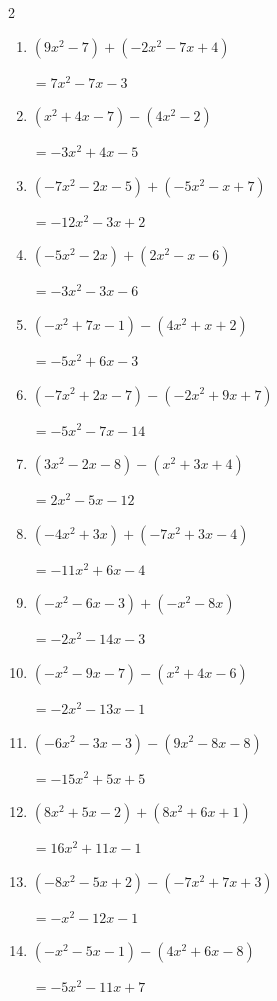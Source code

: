 \begin{multicols}{2}
\begin{enumerate}
  \item $(9x^{2}-7)+(-2x^{2}-7x+4)$

        $=7x^{2}-7x-3$

  \item $(x^{2}+4x-7)-(4x^{2}-2)$

        $=-3x^{2}+4x-5$

  \item $(-7x^{2}-2x-5)+(-5x^{2}-x+7)$

        $=-12x^{2}-3x+2$

  \item $(-5x^{2}-2x)+(2x^{2}-x-6)$

        $=-3x^{2}-3x-6$

  \item $(-x^{2}+7x-1)-(4x^{2}+x+2)$

        $=-5x^{2}+6x-3$

  \item $(-7x^{2}+2x-7)-(-2x^{2}+9x+7)$

        $=-5x^{2}-7x-14$

  \item $(3x^{2}-2x-8)-(x^{2}+3x+4)$

        $=2x^{2}-5x-12$

  \item $(-4x^{2}+3x)+(-7x^{2}+3x-4)$

        $=-11x^{2}+6x-4$

  \item $(-x^{2}-6x-3)+(-x^{2}-8x)$

        $=-2x^{2}-14x-3$

\columnbreak %

  \item $(-x^{2}-9x-7)-(x^{2}+4x-6)$

        $=-2x^{2}-13x-1$

  \item $(-6x^{2}-3x-3)-(9x^{2}-8x-8)$

        $=-15x^{2}+5x+5$

  \item $(8x^{2}+5x-2)+(8x^{2}+6x+1)$

        $=16x^{2}+11x-1$

  \item $(-8x^{2}-5x+2)-(-7x^{2}+7x+3)$

        $=-x^{2}-12x-1$

  \item $(-x^{2}-5x-1)-(4x^{2}+6x-8)$

        $=-5x^{2}-11x+7$


\end{enumerate}
\end{multicols}
